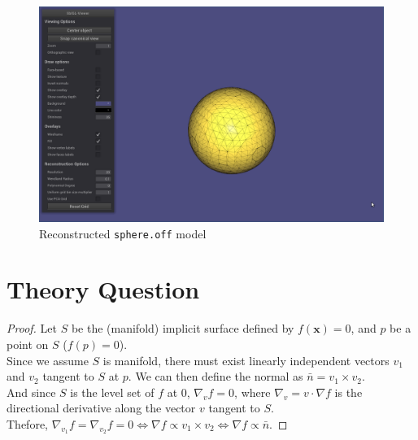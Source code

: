 \documentclass[11pt]{article}
\begin{document}
\begin{figure}[h]
\includegraphics[scale=0.3]{sphere_reconstructed.png}
\caption{Reconstructed \texttt{sphere.off} model}
\end{figure}

\pagebreak

\section*{Theory Question}
\begin{proof}
Let $S$ be the (manifold) implicit surface defined by $f(\mathbf{x}) = 0$, and $p$ be a point on $S$ ($f(p) = 0$). \\

Since we assume $S$ is manifold, there must exist linearly independent vectors $v_1$ and $v_2$ tangent to $S$ at $p$. We can then define the normal as $\bar{n} = v_1 \times v_2$. \\

And since $S$ is the level set of $f$ at $0$, $\nabla_v f = 0$, where $\nabla_v = v \cdot \nabla f$ is the directional derivative along the vector $v$ tangent to $S$. \\

Thefore, $\nabla_{v_1} f = \nabla_{v_2} f = 0 \Leftrightarrow \nabla f \propto v_1 \times v_2 \Leftrightarrow \nabla f \propto \bar{n}$.
\end{proof}
\end{document}

